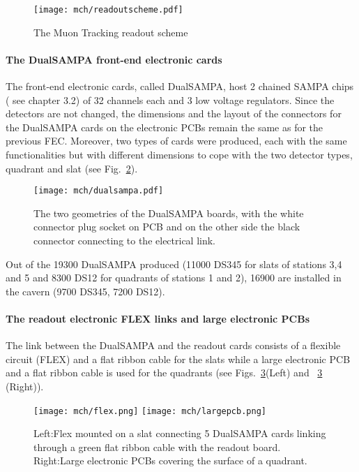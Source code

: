 \begin{figure}[h]
  \centering
  \texttt{[image: mch/readoutscheme.pdf]}
     \caption[Tracking readout scheme]{ The Muon Tracking readout scheme}
  \label{readoutscheme}
\end{figure}

\paragraph{The DualSAMPA front-end electronic cards\\}

The front-end electronic cards, called DualSAMPA, host 2 chained SAMPA chips (
see chapter 3.2) of 32
channels each and 3 low voltage regulators. Since the detectors are not
changed, the dimensions and the layout of the connectors for the DualSAMPA cards on the
electronic PCBs remain the same as for the previous FEC. Moreover, two
types of cards were produced, each with the same functionalities but with
different dimensions to cope with the two detector types, quadrant and
slat (see Fig.~\ref{dualsampa}).

\begin{figure}[h]
  \centering
  \texttt{[image: mch/dualsampa.pdf]}
     \caption[DualSAMPA]{ The two geometries of the DualSAMPA boards,
       with the white connector plug socket on PCB and on the
       other side the black connector connecting to the electrical link. }
  \label{dualsampa}
\end{figure}


Out of the 19300 DualSAMPA produced (11000 DS345 for slats of stations 3,4 and
5 and 8300 DS12 for quadrants of stations 1 and 2), 16900 are
installed in the cavern (9700 DS345, 7200 DS12).

\paragraph{The readout electronic FLEX links and large electronic PCBs\\}

The link between the DualSAMPA and the readout cards consists of a
flexible circuit (FLEX) and a flat ribbon cable for the slats while a
large electronic PCB and a flat ribbon cable is used for the quadrants (see
Figs.~\ref{flex+pcb}(Left) and ~\ref{flex+pcb} (Right)).

\begin{figure}[h]
  \centering
  \texttt{[image: mch/flex.png]}
  \hspace{0.05\textwidth}
  \texttt{[image: mch/largepcb.png]}
   \caption[Electronic links]{Left:Flex mounted on a slat connecting 5
     DualSAMPA cards linking through a green flat ribbon cable with the readout
     board. Right:Large electronic PCBs covering the surface of a quadrant.}
  \label{flex+pcb}
\end{figure}

